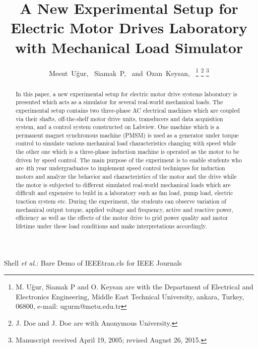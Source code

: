\documentclass[journal]{IEEEtran}
\begin{document}
\title{A New Experimental Setup for Electric Motor Drives Laboratory with Mechanical Load Simulator}

\author{Mesut~U\u{g}ur,~
        Siamak~P,~
        and~Ozan~Keysan,~%
\thanks{M. U\u{g}ur, Siamak P and O. Keysan are with the Department of Electrical and Electronics Engineering, Middle East Technical University, ankara,
Turkey, 06800, e-mail: ugurm@metu.edu.tr}%
\thanks{J. Doe and J. Doe are with Anonymous University.}%
\thanks{Manuscript received April 19, 2005; revised August 26, 2015.}}

%
{Shell \MakeLowercase{\textit{et al.}}: Bare Demo of IEEEtran.cls for IEEE Journals}

\maketitle

\begin{abstract}
In this paper, a new experimental setup for electric motor drive systems laboratory is presented which acts as a simulator for several real-world mechanical loads. The experimental setup contains two three-phase AC electrical machines which are coupled via their shafts, off-the-shelf motor drive units, transducers and data acquisition system, and a control system constructed on Labview. One machine \cite{Wang2017} which is a permanent magnet synchronous machine (PMSM) is used as a generator under torque control to simulate various mechanical load characteristics changing with speed while the other one which is a three-phase induction machine is operated as the motor to be driven by speed control. The main purpose of the experiment is to enable students who are 4th year undergraduates to implement speed control techniques for induction motors and analyze the behavior and characteristics of the motor and the drive while the motor is subjected to different simulated real-world mechanical loads which are difficult and expensive to build in a laboratory such as fan load, pump load, electric traction system etc. During the experiment, the students can observe variation of mechanical output torque, applied voltage and frequency, active and reactive power, efficiency as well as the effects of the motor drive to grid power quality and motor lifetime under these load conditions and make interpretations accordingly.

\end{abstract}
\end{document}

